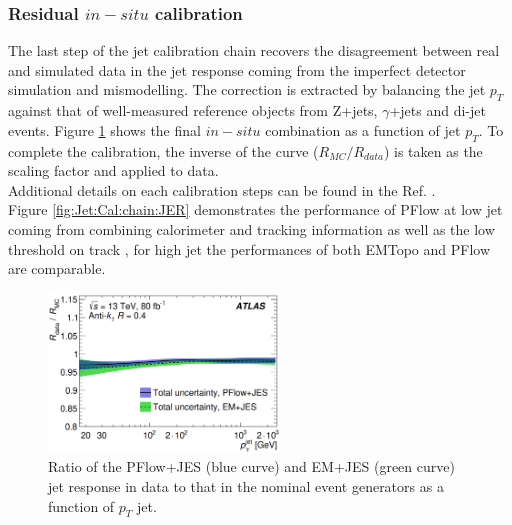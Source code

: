 \subsubsection{Residual $in-situ$ calibration}
\label{Jet:Cal:chain:InSitu}
The last step of the jet calibration chain recovers the disagreement between real and simulated data in the jet response coming from the imperfect detector simulation and mismodelling. The correction is extracted by balancing the jet $p_T$ against that of well-measured reference objects from Z+jets, $\gamma$+jets and di-jet events. Figure \ref{fig:Jet:Cal:chain:InSitu} shows the final $in-situ$ combination as a function of jet $p_T$. To complete the calibration, the inverse of the curve ($R_{MC}/R_{data}$) is taken as the scaling factor and applied to data. \\
Additional details on each calibration steps can be found in the Ref. \cite{JES_Sys_13_TeV}. \\
Figure \ref{fig:Jet:Cal:chain:JER} demonstrates the performance of PFlow at low jet \pT coming from combining calorimeter and tracking information as well as the low threshold on track \pT, for high jet \pT the performances of both EMTopo and PFlow are comparable. 
\begin{figure}[htbp]
    \centering
    \includegraphics[width=0.55\textwidth]{Ch4/Img/Jet_MC_Data_Ration.png}
    \caption{Ratio of the PFlow+JES (blue curve) and EM+JES (green curve) jet response in data to that in the nominal event generators as a function of $p_T$ jet.}
    \label{fig:Jet:Cal:chain:InSitu}
\end{figure}


